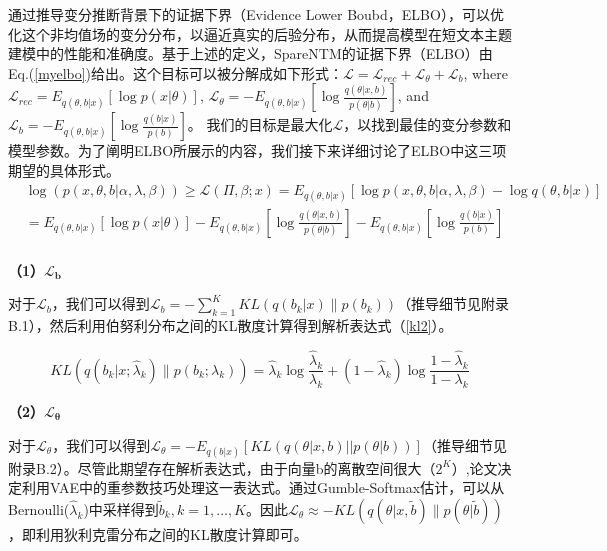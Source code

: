 通过推导变分推断背景下的证据下界（Evidence Lower Boubd，ELBO），可以优化这个非均值场的变分分布，以逼近真实的后验分布，从而提高模型在短文本主题建模中的性能和准确度。基于上述的定义，SpareNTM的证据下界（ELBO）由Eq.(\ref{myelbo})给出。这个目标可以被分解成如下形式：$\mathcal{L}=\mathcal{L}_{rec}+\mathcal{L}_\theta+\mathcal{L}_b$, where $\mathcal{L}_{rec}=E_{q(\theta,b\vert x)}\left[\log p(x\vert\theta)\right]$, $\mathcal{L}_\theta=-E_{q(\theta,b\vert x)}\left[\log\frac{q(\theta\vert x,b)}{p(\theta\vert b)}\right]$, and $\mathcal{L}_b=-E_{q(\theta,b\vert x)}\left[\log\frac{q(b\vert x)}{p(b)}\right]$。 我们的目标是最大化$\mathcal{L}$，以找到最佳的变分参数和模型参数。为了阐明ELBO所展示的内容，我们接下来详细讨论了ELBO中这三项期望的具体形式。
\begin{align}
    \label{myelbo}
    &\log(p(x,\theta,b\vert\alpha,\lambda,\beta))\geq\mathcal{L}(\Pi,\beta;x)=E_{q(\theta,b\vert x)}\left[\log p(x,\theta,b\vert \alpha,\lambda,\beta) - \log q(\theta,b\vert x)\right]\nonumber\\
	&=E_{q(\theta,b|x)}\left[\log p(x|\theta)\right]-E_{q(\theta,b|x)}\left[\log\frac{q(\theta|x,b)}{p(\theta|b)}\right]-E_{q(\theta,b|x)}\left[\log\frac{q(b|x)}{p(b)}\right]\nonumber\\
\end{align}

\textbf{（1）$\boldsymbol{\mathcal{L}_b}$}

对于$\mathcal{L}_b$，我们可以得到$\mathcal{L}_b=-\sum_{k=1}^{K}KL(q(b_k\vert x)\|p(b_k))$（推导细节见附录B.1），然后利用伯努利分布之间的KL散度计算得到解析表达式（\ref{kl2}）。

\begin{equation}
    \label{kl2}
    KL(q(b_k\vert x;\hat{\lambda}_k)\|p(b_k;\lambda_k))=\hat{\lambda}_k\log\frac{\hat{\lambda}_k}{\lambda_k}+(1-\hat{\lambda}_k)\log\frac{1-\hat{\lambda}_k}{1-\lambda_k}
\end{equation}

\textbf{（2）$\boldsymbol{\mathcal{L}_\theta}$}

对于$\mathcal{L}_\theta$，我们可以得到$\mathcal{L}_\theta=-E_{q(b\vert x)}\left[KL(q(\theta\vert x,b)||p(\theta\vert b))\right]$（推导细节见附录B.2）。尽管此期望存在解析表达式，由于向量b的离散空间很大（$2^K$）,论文决定利用VAE中的重参数技巧\cite{VAE}处理这一表达式。通过Gumble-Softmax估计，可以从Bernoulli($\hat{\lambda}_k$)中采样得到$\tilde{b}_k,k=1,\dots,K$。因此$\mathcal{L}_{\theta}\approx-KL(q(\theta\vert x,\tilde{b})\|p(\theta\vert\tilde{b}))$，即利用狄利克雷分布之间的KL散度计算即可。

